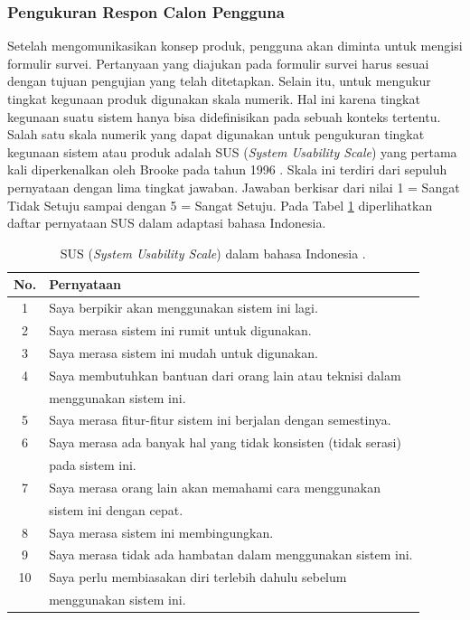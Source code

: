 \subsubsection{Pengukuran Respon Calon Pengguna}
Setelah mengomunikasikan konsep produk, pengguna akan diminta untuk mengisi formulir survei. Pertanyaan yang diajukan pada formulir survei harus sesuai dengan tujuan pengujian yang telah ditetapkan. Selain itu, untuk mengukur tingkat kegunaan produk digunakan skala numerik. Hal ini karena tingkat kegunaan suatu sistem hanya bisa didefinisikan pada sebuah konteks tertentu. Salah satu skala numerik yang dapat digunakan untuk pengukuran tingkat kegunaan sistem atau produk adalah SUS (\textit{System Usability Scale}) yang pertama kali diperkenalkan oleh Brooke pada tahun 1996 \cite{SUS}. Skala ini terdiri dari sepuluh pernyataan dengan lima tingkat jawaban. Jawaban berkisar dari nilai 1 = Sangat Tidak Setuju sampai dengan 5 = Sangat Setuju. Pada Tabel \ref{tab:susIndonesia} diperlihatkan daftar pernyataan SUS dalam adaptasi bahasa Indonesia. \par 
\begin{table}[t!]
    \centering
    \caption{SUS (\textit{System Usability Scale}) dalam bahasa Indonesia \cite{SUSIndonesia}.}
    \begin{tabular}{c m{11cm}}
        \hline
        \textbf{No.} & \textbf{Pernyataan}\\
        \hline
        1 & Saya berpikir akan menggunakan sistem ini lagi.\\
        2 & Saya merasa sistem ini rumit untuk digunakan. \\
        3 & Saya merasa sistem ini mudah untuk digunakan. \\
        4 & Saya membutuhkan bantuan dari orang lain atau teknisi dalam\\
        &  menggunakan sistem ini. \\
        5 & Saya merasa fitur-fitur sistem ini berjalan dengan semestinya. \\
        6 & Saya merasa ada banyak hal yang tidak konsisten (tidak serasi)\\
        &  pada sistem ini.\\
        7 & Saya merasa orang lain akan memahami cara menggunakan\\
        & sistem ini dengan cepat. \\
        8 & Saya merasa sistem ini membingungkan. \\
        9 & Saya merasa tidak ada hambatan dalam menggunakan sistem ini. \\
        10 & Saya perlu membiasakan diri terlebih dahulu sebelum \\
        &  menggunakan sistem ini.\\
        \hline
    \end{tabular}
    \label{tab:susIndonesia}
\end{table}
